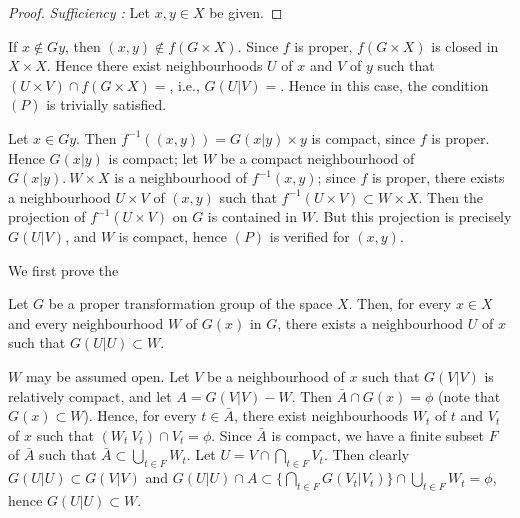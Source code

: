 \begin{proof}
  \textit{Sufficiency :} Let $x, y \in X$ be given.
\end{proof}


\begin{case}%
  If $x \notin Gy$, then $(x, y) \notin f(G \times X)$. Since $f$ is
  proper, $f(G \times X)$ is closed in $X \times X$. Hence there exist
  neighbourhoods $U$ of $x$ and $V$ of $y$ such that $(U \times V) \cap
  f(G \times X) = $, i.e., $G(U | V) = $. Hence in this case,
  the condition $(P)$ is trivially satisfied. 
\end{case}

\begin{case}%
  Let $x \in Gy$. Then $f^{-1}((x, y)) = G(x | y)\times y$ is compact,
  since $f$ is proper. Hence $G(x |y)$ is compact; let $W$ be a compact
  neighbourhood of $G(x | y). ~ W \times X$ is a neighbourhood of
  $f^{-1}(x, y)$; since $f$ is proper, there exists a neighbourhood $U
  \times V$ of $(x, y)$ such that $f^{-1}(U \times V)\subset W \times
  X$. Then the projection of $f^{-1}(U \times V)$ on $G$ is contained in
  $W$. But this projection is precisely $G(U|V)$, and $W$ is compact,
  hence $(P)$ is verified for $(x, y)$. 
\end{case}

\medskip
{}
 We first prove the
\begin{lem}\label{chap1:lem1}%
  Let $G$ be a proper transformation group of the space $X$. Then, for
  every $x \in X$ and every neighbourhood $W$ of $G(x)$ in $G$, there
  exists a neighbourhood $U$ of $x$ such that $G(U | U) \subset W$. 
\end{lem}

\begin{proofofthelemma*}
  $W$ may be assumed open. Let $V$ be a neighbourhood of $x$ such that
  $G(V | V)$  is relatively compact, and let $A=G(V | V)-W$. Then
  $\bar{A}\cap G(x)=\phi$ (note that  $G(x)\subset W$). Hence, for
  every $t \in \bar{A}$, there exist neighbourhoods $W_t$ of $t$ and
  $V_t$ of $x$ such that $(W_t~V_t)\cap V_t=\phi$. Since\pageoriginale
  $\bar{A}$ is 
  compact, we have a finite subset $F$ of $\bar{A}$ such that
  $\bar{A}\subset \bigcup \limits_{t \in F}W_t$. Let $U=V \cap
  \bigcap\limits_{t \in F}V_t$. Then clearly $G(U |U)\subset G(V |V)$
  and $G(U | U)\cap A \subset \bigg\{ \bigcap\limits_{t \in F}G(V_t |
  V_t)\bigg\}\cap  \bigcup\limits_{t \in F}W_t= \phi$, hence $G(U |
  U)\subset W$. 
\end{proofofthelemma*}

